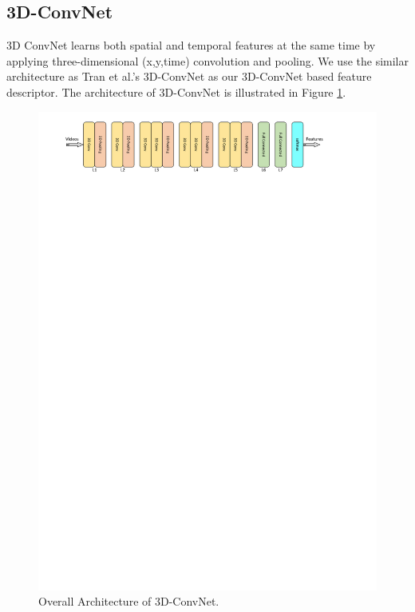 \subsection{3D-ConvNet}
\label{3_3_1}
3D ConvNet learns both spatial and temporal features at the same time by applying three-dimensional (x,y,time) convolution and pooling. We use the similar architecture as Tran et al.'s 3D-ConvNet\cite{Tran2015} as our 3D-ConvNet based feature descriptor. The architecture of 3D-ConvNet is illustrated in Figure \ref{fig:c3d}. 
\begin{figure}
	\includegraphics[trim=2cm 26cm 0cm 1cm]{fig01/3dConvNet.pdf}
	\caption{Overall Architecture of 3D-ConvNet. }
	\label{fig:c3d}
\end{figure}

